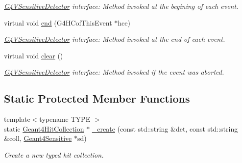 \begin{DoxyCompactItemize}
\begin{DoxyCompactList}\small\item\em \hyperlink{class_g4_v_sensitive_detector}{G4\+V\+Sensitive\+Detector} interface\+: Method invoked at the begining of each event. \end{DoxyCompactList}\item 
virtual void \hyperlink{class_d_d4hep_1_1_simulation_1_1_geant4_sens_det_action_sequence_a2b7944c785413b2a479f4ba4ad2e1515}{end} (G4\+H\+Cof\+This\+Event $\ast$hce)
\begin{DoxyCompactList}\small\item\em \hyperlink{class_g4_v_sensitive_detector}{G4\+V\+Sensitive\+Detector} interface\+: Method invoked at the end of each event. \end{DoxyCompactList}\item 
virtual void \hyperlink{class_d_d4hep_1_1_simulation_1_1_geant4_sens_det_action_sequence_ab2bab9282950af33d3e14e3f0d5864fd}{clear} ()
\begin{DoxyCompactList}\small\item\em \hyperlink{class_g4_v_sensitive_detector}{G4\+V\+Sensitive\+Detector} interface\+: Method invoked if the event was aborted. \end{DoxyCompactList}\end{DoxyCompactItemize}
\subsection*{Static Protected Member Functions}
\begin{DoxyCompactItemize}
\item 
{\footnotesize template$<$typename T\+Y\+PE $>$ }\\static \hyperlink{class_d_d4hep_1_1_simulation_1_1_geant4_hit_collection}{Geant4\+Hit\+Collection} $\ast$ \hyperlink{class_d_d4hep_1_1_simulation_1_1_geant4_sens_det_action_sequence_a56f76d9b03d5610cbcccc0468d519c1d}{\+\_\+create} (const std\+::string \&det, const std\+::string \&coll, \hyperlink{class_d_d4hep_1_1_simulation_1_1_geant4_sensitive}{Geant4\+Sensitive} $\ast$sd)
\begin{DoxyCompactList}\small\item\em Create a new typed hit collection. \end{DoxyCompactList}\end{DoxyCompactItemize}
